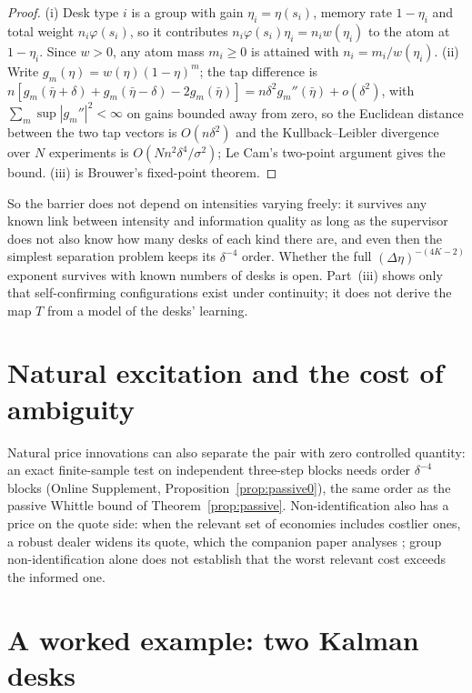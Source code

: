 \documentclass[12pt]{article}
\theoremstyle{definition}
\theoremstyle{remark}
\begin{document}
\begin{proof}
(i) Desk type $i$ is a group with gain $\eta_i=\eta(s_i)$, memory rate $1-\eta_i$ and total weight $n_i\varphi(s_i)$, so it contributes $n_i\varphi(s_i)\eta_i=n_iw(\eta_i)$ to the atom at $1-\eta_i$. Since $w>0$, any atom mass $m_i\ge0$ is attained with $n_i=m_i/w(\eta_i)$. (ii) Write $g_m(\eta)=w(\eta)(1-\eta)^m$; the tap difference is $n[g_m(\bar\eta+\delta)+g_m(\bar\eta-\delta)-2g_m(\bar\eta)]=n\delta^2g_m''(\bar\eta)+o(\delta^2)$, with $\sum_m\sup|g_m''|^2<\infty$ on gains bounded away from zero, so the Euclidean distance between the two tap vectors is $O(n\delta^2)$ and the Kullback--Leibler divergence over $N$ experiments is $O(Nn^2\delta^4/\sigma^2)$; Le Cam's two-point argument gives the bound. (iii) is Brouwer's fixed-point theorem.
\end{proof}

So the barrier does not depend on intensities varying freely: it survives any known link between intensity and information quality as long as the supervisor does not also know how many desks of each kind there are, and even then the simplest separation problem keeps its $\delta^{-4}$ order. Whether the full $(\Delta\eta)^{-(4K-2)}$ exponent survives with known numbers of desks is open. Part~(iii) shows only that self-confirming configurations exist under continuity; it does not derive the map $T$ from a model of the desks' learning.

\section{Natural excitation and the cost of ambiguity}

Natural price innovations can also separate the pair with zero controlled quantity: an exact finite-sample test on independent three-step blocks needs order $\delta^{-4}$ blocks (Online Supplement, Proposition~\ref{prop:passive0}), the same order as the passive Whittle bound of Theorem~\ref{prop:passive}. Non-identification also has a price on the quote side: when the relevant set of economies includes costlier ones, a robust dealer widens its quote, which the companion paper analyses \citep{niroula2026b}; group non-identification alone does not establish that the worst relevant cost exceeds the informed one.
\section{A worked example: two Kalman desks}\label{sec:worked}
\end{document}
